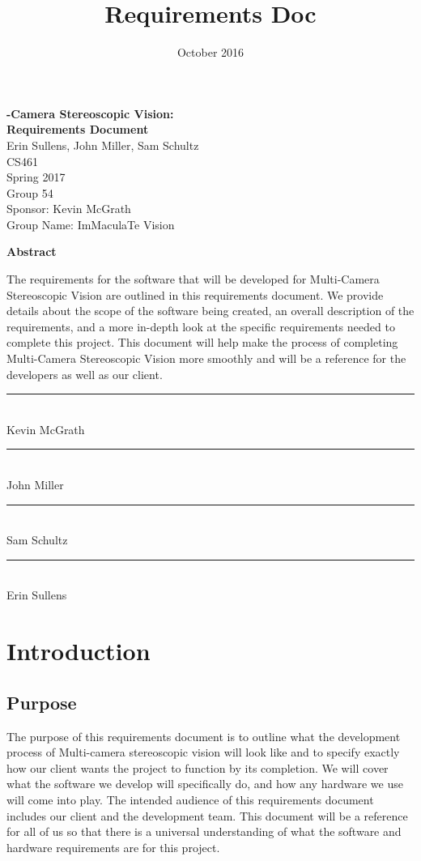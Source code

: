 \documentclass[10pt,letterpaper,onecolumn]{article}
\title{Requirements Doc}
\author{}
\date{October 2016}
\makeatletter
\renewcommand{\maketitle}{\bgroup\setlength{\parindent}{0pt}
  \begin{flushleft}
    \Huge
      \textbf{\@Multi-Camera Stereoscopic Vision: \\Requirements Document}
    \large
      \vspace{3mm}\\
      Erin Sullens, John Miller, Sam Schultz \\
      \vspace{3mm}
      CS461
      \\
      Spring 2017
      \\
      Group 54
      \\
      Sponsor: Kevin McGrath
      \\
      Group Name: ImMaculaTe Vision
      \\
  \end{flushleft}\egroup
}
\makeatother
\begin{document}
\singlespacing
\maketitle
\begin{center}
  \vspace{2in}
  \textbf{Abstract}
\end{center}

\setlength{\parindent}{0cm}
The requirements for the software that will be developed for Multi-Camera Stereoscopic Vision are outlined in this requirements document. We provide details about the scope of the software being created, an overall description of the requirements, and a more in-depth look at the specific requirements needed to complete this project. This document will help make the process of completing Multi-Camera Stereoscopic Vision more smoothly and will be a reference for the developers as well as our client.  \\
\vspace{.75in}

\noindent\rule{10cm}{0.4pt} \\
Kevin McGrath

\vspace{1cm}
\noindent\rule{10cm}{0.4pt} \\
John Miller

\vspace{1cm}
\noindent\rule{10cm}{0.4pt} \\
Sam Schultz

\vspace{1cm}
\noindent\rule{10cm}{0.4pt} \\
Erin Sullens

\newpage
\tableofcontents
\newpage

\section{Introduction}
\subsection{Purpose}
The purpose of this requirements document is to outline what the development process of Multi-camera stereoscopic vision will look like and to specify exactly how our client wants the project to function by its completion.
We will cover what the software we develop will specifically do, and how any hardware we use will come into play.
The intended audience of this requirements document includes our client and the development team.
This document will be a reference for all of us so that there is a universal understanding of what the software and hardware requirements are for this project.
\\
\end{document}
